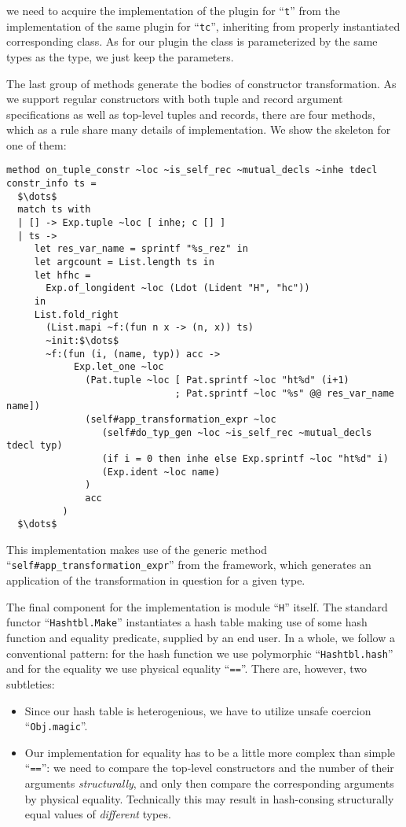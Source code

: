 we need to acquire the implementation of the plugin for ``\lstinline{t}'' from the implementation of the same plugin for ``\lstinline{tc}'', inheriting
from properly instantiated corresponding class. As for our plugin the class is parameterized by the same types as the type, we just keep the parameters.

The last group of methods generate the bodies of constructor transformation. As we support regular constructors with both tuple and record
argument specifications as well as top-level tuples and records, there are four methods, which as a rule share many details of implementation. We show the
skeleton for one of them:

\begin{lstlisting}
method on_tuple_constr ~loc ~is_self_rec ~mutual_decls ~inhe tdecl constr_info ts =
  $\dots$ 
  match ts with
  | [] -> Exp.tuple ~loc [ inhe; c [] ]
  | ts ->
     let res_var_name = sprintf "%s_rez" in
     let argcount = List.length ts in
     let hfhc =
       Exp.of_longident ~loc (Ldot (Lident "H", "hc"))
     in
     List.fold_right
       (List.mapi ~f:(fun n x -> (n, x)) ts)
       ~init:$\dots$
       ~f:(fun (i, (name, typ)) acc ->
            Exp.let_one ~loc
              (Pat.tuple ~loc [ Pat.sprintf ~loc "ht%d" (i+1)
                              ; Pat.sprintf ~loc "%s" @@ res_var_name name])
              (self#app_transformation_expr ~loc
                 (self#do_typ_gen ~loc ~is_self_rec ~mutual_decls tdecl typ)
                 (if i = 0 then inhe else Exp.sprintf ~loc "ht%d" i)
                 (Exp.ident ~loc name)
              )
              acc
          )
  $\dots$
\end{lstlisting}

This implementation makes use of the generic method ``\lstinline{self#app_transformation_expr}'' from the framework, which generates an application of
the transformation in question for a given type.

The final component for the implementation is module ``\lstinline{H}'' itself. The standard functor ``\lstinline{Hashtbl.Make}'' instantiates a
hash table making use of some hash function and equality predicate, supplied by an end user. In a whole, we follow a conventional pattern:
for the hash function we use polymorphic ``\lstinline{Hashtbl.hash}'' and for the equality we use physical equality ``\lstinline{==}''. There are, however, two
subtleties:

\begin{itemize}
\item Since our hash table is heterogenious, we have to utilize unsafe coercion ``\lstinline{Obj.magic}''.
\item Our implementation for equality has to be a little more complex than simple ``\lstinline{==}'': we need to compare the top-level constructors and
  the number of their arguments \emph{structurally}, and only then compare the corresponding arguments by physical equality. Technically this
  may result in hash-consing structurally equal values of \emph{different} types.
\end{itemize}


